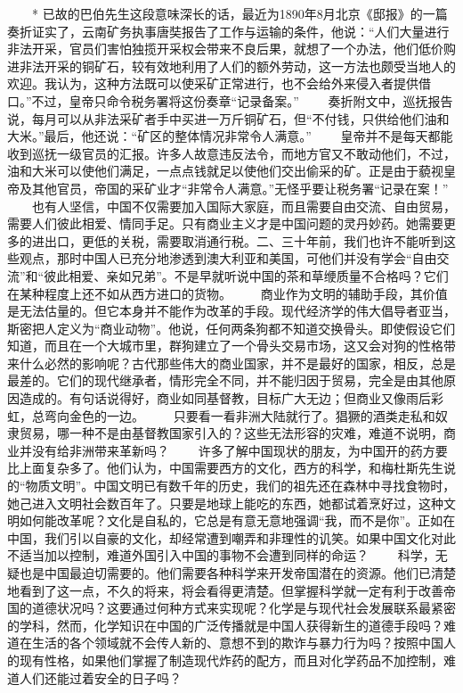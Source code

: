 \documentclass[12pt,oneside]{book}
\begin{document}
\begin{common-format}
　　* 已故的巴伯先生这段意味深长的话，最近为1890年8月北京《邸报》的一篇奏折证实了，云南矿务执事唐奘报告了工作与运输的条件，他说：“人们大量进行非法开采，官员们害怕独揽开采权会带来不良后果，就想了一个办法，他们低价购进非法开采的铜矿石，较有效地利用了人们的额外劳动，这一方法也颇受当地人的欢迎。我认为，这种方法既可以使采矿正常进行，也不会给外来侵入者提供借口。”不过，皇帝只命令税务署将这份奏章“记录备案。” 
　　奏折附文中，巡抚报告说，每月可以从非法采矿者手中买进一万斤铜矿石，但“不付钱，只供给他们油和大米。”最后，他还说：“矿区的整体情况非常令人满意。” 
　　皇帝并不是每天都能收到巡抚一级官员的汇报。许多人故意违反法令，而地方官又不敢动他们，不过，油和大米可以使他们满足，一点点钱就足以使他们交出偷采的矿。正是由于藐视皇帝及其他官员，帝国的采矿业才“非常令人满意。”无怪乎要让税务署“记录在案！” 
　　也有人坚信，中国不仅需要加入国际大家庭，而且需要自由交流、自由贸易，需要人们彼此相爱、情同手足。只有商业主义才是中国问题的灵丹妙药。她需要更多的进出口，更低的关税，需要取消通行税。二、三十年前，我们也许不能听到这些观点，那时中国人已充分地渗透到澳大利亚和美国，可他们并没有学会“自由交流”和“彼此相爱、亲如兄弟”。不是早就听说中国的茶和草缏质量不合格吗？它们在某种程度上还不如从西方进口的货物。 
　　商业作为文明的辅助手段，其价值是无法估量的。但它本身并不能作为改革的手段。现代经济学的伟大倡导者亚当，斯密把人定义为“商业动物”。他说，任何两条狗都不知道交换骨头。即使假设它们知道，而且在一个大城市里，群狗建立了一个骨头交易市场，这又会对狗的性格带来什么必然的影响呢？古代那些伟大的商业国家，并不是最好的国家，相反，总是最差的。它们的现代继承者，情形完全不同，并不能归因于贸易，完全是由其他原因造成的。有句话说得好，商业如同基督教，目标广大无边；但商业又像雨后彩虹，总弯向金色的一边。 
　　只要看一看非洲大陆就行了。猖獗的酒类走私和奴隶贸易，哪一种不是由基督教国家引入的？这些无法形容的灾难，难道不说明，商业并没有给非洲带来革新吗？ 
　　许多了解中国现状的朋友，为中国开的药方要比上面复杂多了。他们认为，中国需要西方的文化，西方的科学，和梅杜斯先生说的“物质文明”。中国文明已有数千年的历史，我们的祖先还在森林中寻找食物时，她己进入文明社会数百年了。只要是地球上能吃的东西，她都试着烹好过，这种文明如何能改革呢？文化是自私的，它总是有意无意地强调“我，而不是你”。正如在中国，我们引以自豪的文化，却经常遭到嘲弄和非理性的讥笑。如果中国文化对此不适当加以控制，难道外国引入中国的事物不会遭到同样的命运？ 
　　科学，无疑也是中国最迫切需要的。他们需要各种科学来开发帝国潜在的资源。他们已清楚地看到了这一点，不久的将来，将会看得更清楚。但掌握科学就一定有利于改善帝国的道德状况吗？这要通过何种方式来实现呢？化学是与现代社会发展联系最紧密的学科，然而，化学知识在中国的广泛传播就是中国人获得新生的道德手段吗？难道在生活的各个领域就不会传人新的、意想不到的欺诈与暴力行为吗？按照中国人的现有性格，如果他们掌握了制造现代炸药的配方，而且对化学药品不加控制，难道人们还能过着安全的日子吗？ 

\end{common-format}
\end{document}
